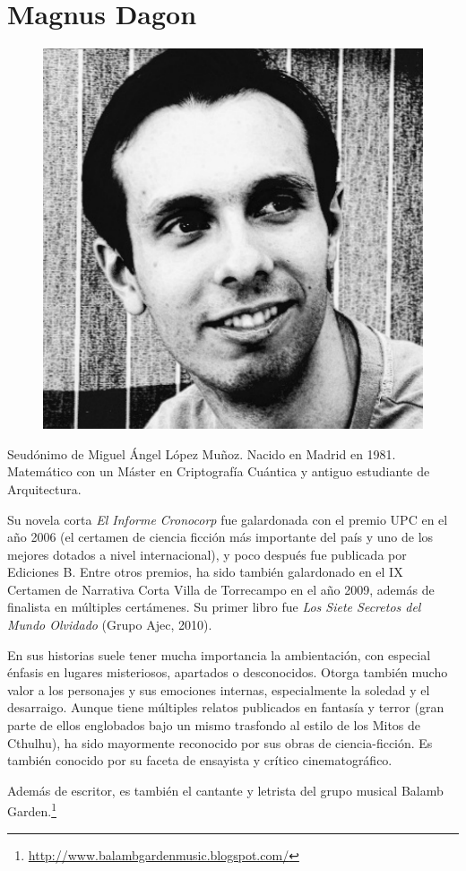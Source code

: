 \section*{Magnus Dagon}
\begin{small}
	\begin{figure}
		\includegraphics[width=.4\textwidth]{images/magnus_dagon}
	\end{figure}

	Seudónimo de Miguel Ángel López Muñoz. Nacido en Madrid en 1981. Matemático con un Máster en Criptografía Cuántica y antiguo estudiante de Arquitectura. 

	Su novela corta \emph{El Informe Cronocorp} fue galardonada con el premio UPC en el año 2006 (el certamen de ciencia ficción más importante del país y uno de los mejores dotados a nivel internacional), y poco después fue publicada por Ediciones B. Entre otros premios, ha sido también galardonado en el IX Certamen de Narrativa Corta Villa de Torrecampo en el año 2009, además de finalista en múltiples certámenes. Su primer libro fue \emph{Los Siete Secretos del Mundo Olvidado} (Grupo Ajec, 2010).

	En sus historias suele tener mucha importancia la ambientación, con especial énfasis en lugares misteriosos, apartados o desconocidos. Otorga también mucho valor a los personajes y sus emociones internas, especialmente la soledad y el desarraigo. Aunque tiene múltiples relatos publicados en fantasía y terror (gran parte de ellos englobados bajo un mismo trasfondo al estilo de los Mitos de Cthulhu), ha sido mayormente reconocido por sus obras de ciencia-ficción. Es también conocido por su faceta de ensayista y crítico cinematográfico.

	Además de escritor, es también el cantante y letrista del grupo musical Balamb Garden.\footnote{\scriptsize\url{http://www.balambgardenmusic.blogspot.com/}}
\end{small}

